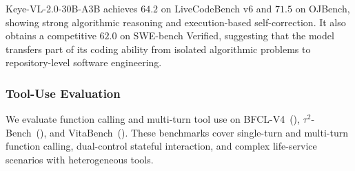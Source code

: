 \documentclass{llmxive}
\providecommand{\arraystretch}{1.15}
\begin{document}
\begin{table}[t]
\centering
\setlength{\tabcolsep}{3pt}
\renewcommand{\arraystretch}{1.15}
\caption{Code agent evaluation of Keye-VL-2.0-30B-A3B against representative baselines. \textbf{Bold} marks the best result per row, \underline{underline} marks the second-best, and ``--'' indicates an unavailable comparable score.}
\label{tab:code_agent_eval}
\end{table}

Keye-VL-2.0-30B-A3B achieves $64.2$ on LiveCodeBench v6 and $71.5$ on OJBench, showing strong algorithmic reasoning and execution-based self-correction. It also obtains a competitive $62.0$ on SWE-bench Verified, suggesting that the model transfers part of its coding ability from isolated algorithmic problems to repository-level software engineering.

\subsubsection{Tool-Use Evaluation}

We evaluate function calling and multi-turn tool use on BFCL-V4~(\cite{bfcl}), $\tau^2$-Bench~(\cite{tau2bench}), and VitaBench~(\cite{vitabench}). These benchmarks cover single-turn and multi-turn function calling, dual-control stateful interaction, and complex life-service scenarios with heterogeneous tools.
\end{document}
